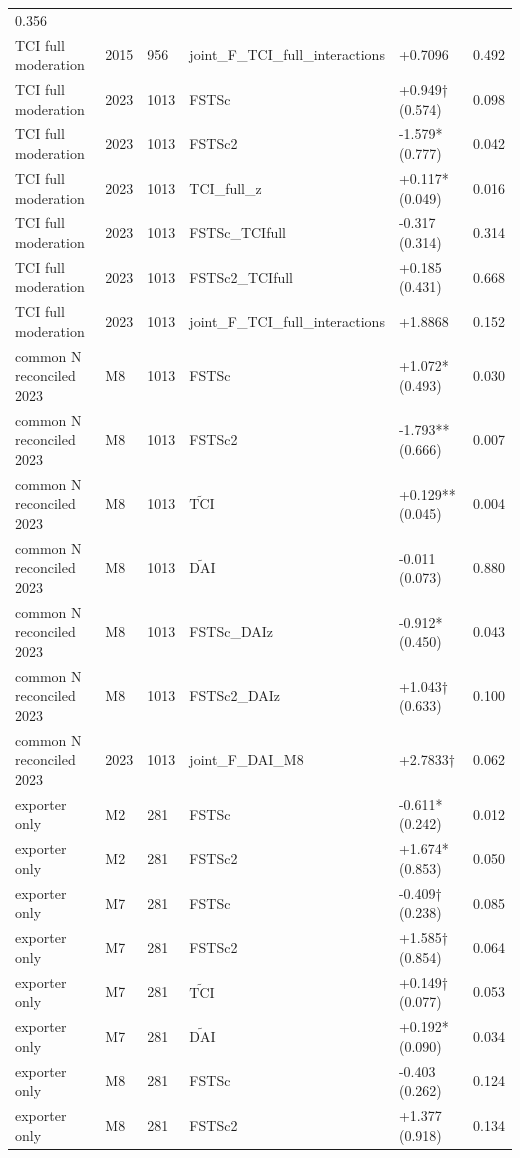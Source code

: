 \documentclass[12pt,a4paper]{article}
\begin{document}
\begin{longtable}[]{@{}llllll@{}}
0.356 \\
TCI full moderation & 2015 & 956 & joint\_F\_TCI\_full\_interactions &
+0.7096 & 0.492 \\
TCI full moderation & 2023 & 1013 & FSTSc & +0.949† (0.574) & 0.098 \\
TCI full moderation & 2023 & 1013 & FSTSc2 & -1.579* (0.777) & 0.042 \\
TCI full moderation & 2023 & 1013 & TCI\_full\_z & +0.117* (0.049) &
0.016 \\
TCI full moderation & 2023 & 1013 & FSTSc\_TCIfull & -0.317 (0.314) &
0.314 \\
TCI full moderation & 2023 & 1013 & FSTSc2\_TCIfull & +0.185 (0.431) &
0.668 \\
TCI full moderation & 2023 & 1013 & joint\_F\_TCI\_full\_interactions &
+1.8868 & 0.152 \\
common N reconciled 2023 & M8 & 1013 & FSTSc & +1.072* (0.493) &
0.030 \\
common N reconciled 2023 & M8 & 1013 & FSTSc2 & -1.793** (0.666) &
0.007 \\
common N reconciled 2023 & M8 & 1013 & \(\tilde{\mathrm{TCI}}\) &
+0.129** (0.045) & 0.004 \\
common N reconciled 2023 & M8 & 1013 & \(\tilde{\mathrm{DAI}}\) & -0.011
(0.073) & 0.880 \\
common N reconciled 2023 & M8 & 1013 & FSTSc\_DAIz & -0.912* (0.450) &
0.043 \\
common N reconciled 2023 & M8 & 1013 & FSTSc2\_DAIz & +1.043† (0.633) &
0.100 \\
common N reconciled 2023 & 2023 & 1013 & joint\_F\_DAI\_M8 & +2.7833† &
0.062 \\
exporter only & M2 & 281 & FSTSc & -0.611* (0.242) & 0.012 \\
exporter only & M2 & 281 & FSTSc2 & +1.674* (0.853) & 0.050 \\
exporter only & M7 & 281 & FSTSc & -0.409† (0.238) & 0.085 \\
exporter only & M7 & 281 & FSTSc2 & +1.585† (0.854) & 0.064 \\
exporter only & M7 & 281 & \(\tilde{\mathrm{TCI}}\) & +0.149† (0.077) &
0.053 \\
exporter only & M7 & 281 & \(\tilde{\mathrm{DAI}}\) & +0.192* (0.090) &
0.034 \\
exporter only & M8 & 281 & FSTSc & -0.403 (0.262) & 0.124 \\
exporter only & M8 & 281 & FSTSc2 & +1.377 (0.918) & 0.134 \\

\end{longtable}
\end{document}
